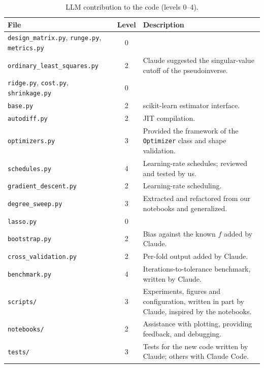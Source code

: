 \begin{table}[htbp]
    \centering
    \caption{LLM contribution to the code (levels 0--4).}
    \label{tab:code-generation}
    {\footnotesize
    \begin{tabularx}{\textwidth}{@{}l c X@{}}
        \toprule
        \textbf{File} & \textbf{Level} & \textbf{Description} \\
        \midrule
        \texttt{design\_matrix.py}, \texttt{runge.py}, \texttt{metrics.py} & 0 & \\
        \texttt{ordinary\_least\_squares.py} & 2 & Claude suggested the singular-value cutoff of the pseudoinverse. \\
        \texttt{ridge.py}, \texttt{cost.py}, \texttt{shrinkage.py} & 0 & \\
        \texttt{base.py} & 2 & scikit-learn estimator interface. \\
        \texttt{autodiff.py} & 2 & JIT compilation. \\
        \texttt{optimizers.py} & 3 & Provided the framework of the \texttt{Optimizer} class and shape validation. \\
        \texttt{schedules.py} & 4 & Learning-rate schedules; reviewed and tested by us. \\
        \texttt{gradient\_descent.py} & 2 & Learning-rate scheduling. \\
        \texttt{degree\_sweep.py} & 3 & Extracted and refactored from our notebooks and generalized. \\
        \texttt{lasso.py} & 0 & \\
        \texttt{bootstrap.py} & 2 & Bias against the known $f$ added by Claude. \\
        \texttt{cross\_validation.py} & 2 & Per-fold output added by Claude. \\
        \texttt{benchmark.py} & 4 & Iterations-to-tolerance benchmark, written by Claude. \\
        \texttt{scripts/} & 3 & Experiments, figures and configuration, written in part by Claude,
                                inspired by the notebooks. \\
        \texttt{notebooks/} & 2 & Assistance with plotting, providing feedback, and debugging. \\
        \texttt{tests/} & 3 & Tests for the new code written by Claude; others with Claude Code. \\
        \bottomrule
    \end{tabularx}}
\end{table}
